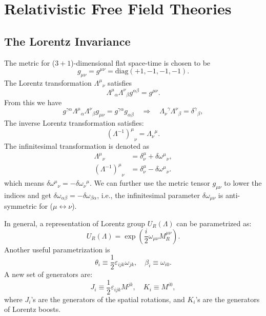 \chapter{Relativistic Free Field Theories}

\section{The Lorentz Invariance}

The metric for ($3+1$)-dimensional flat space-time is chosen to be
\begin{equation}
	g_{\mu\nu}=g^{\mu\nu}=\mathrm{diag}(+1,-1,-1,-1).
\end{equation}
The Lorentz transformation ${\Lambda^{\mu}}_{\nu}$ satisfies
\begin{equation}
{\Lambda^{\mu}}_{\alpha}{\Lambda^{\nu}}_{\beta} g^{\alpha\beta} = g^{\mu\nu}.
\end{equation}
From this we have
\begin{equation}
	g^{\gamma\alpha}{\Lambda^{\mu}}_{\alpha}{\Lambda^{\nu}}_{\beta} g_{\mu\nu} 
	= g^{\gamma\alpha}g_{\alpha\beta} 
	\quad \Longrightarrow \quad
	{\Lambda_{\nu}}^{\gamma}{\Lambda^{\nu}}_{\beta} 
	= {\delta^{\gamma}}_{\beta},
\end{equation}
The inverse Lorentz transformation satisfies:
\begin{equation}
	{(\Lambda^{-1})^{\mu}}_{\nu} = {\Lambda_{\nu}}^{\mu}.
\end{equation}
The infinitesimal transformation is denoted as
\begin{equation}
\begin{aligned}
	{\Lambda^{\mu}}_{\nu} &= \delta^{\mu}_{\nu}+\delta{\omega^{\mu}}_{\nu}, \\
	{(\Lambda^{-1})^\mu}_\nu &= \delta^{\mu}_{\nu}-\delta{\omega^\mu}_\nu.
\end{aligned}
\end{equation}
which means $\delta {\omega^\mu}_\nu = -\delta {\omega_\nu}^\mu$.
We can further use the metric tensor $g_{\mu\nu}$ to lower the indices and get $\delta\omega_{\alpha\beta} = -\delta\omega_{\beta\alpha}$, i.e., the infinitesimal parameter $\delta \omega_{\mu\nu}$ is anti-symmetric for ($\mu \leftrightarrow \nu$).

In general, a representation of Lorentz group $U_R(\Lambda)$ can be parametrized as:
\begin{equation}
	U_R(\Lambda) = \exp\left(\frac{i}{2}\omega_{\mu\nu}M_R^{\mu\nu}\right).
\end{equation}
Another useful parametrization is
\begin{equation}
	\theta_i \equiv \frac{1}{2}\varepsilon_{ijk}\omega_{jk}, \quad 
	\beta_i \equiv \omega_{i0}.
\end{equation}
A new set of generators are:
\begin{equation}
	J_i \equiv \frac{1}{2}\varepsilon_{ijk}M^{jk}, \quad 
	K_i \equiv M^{i0},
\end{equation}
where $J_i$'s are the generators of the spatial rotations, and $K_i$'s are the generators of Lorentz boosts.

